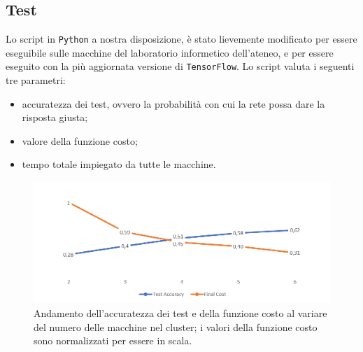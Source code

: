 \documentclass[DIV=calc, paper=a4, fontsize=11pt]{scrartcl}	 %
\begin{document}
\begin{multicols}{2}
		\subsection{Test}
			Lo script in \texttt{Python} a nostra disposizione, è stato lievemente modificato per essere eseguibile sulle macchine del laboratorio informetico dell'ateneo, e per essere eseguito con la più aggiornata versione di \texttt{TensorFlow}. Lo script valuta i seguenti tre parametri:
			\begin{itemize}
				\item accuratezza dei test, ovvero la probabilità con cui la rete possa dare la risposta giusta;
				\item valore della funzione costo;
				\item tempo totale impiegato da tutte le macchine.
			\end{itemize}
		\begin{figure}[th]
			\centering
			\includegraphics[scale=.95]{img/accuracy-cost.png}
			\caption{Andamento dell'accuratezza dei test e della funzione costo al variare del numero delle macchine nel cluster; i valori della funzione costo sono normalizzati per essere in scala.}
			\label{fig:accuracy-cost}
		\end{figure}
			

\end{multicols}
\end{document}
